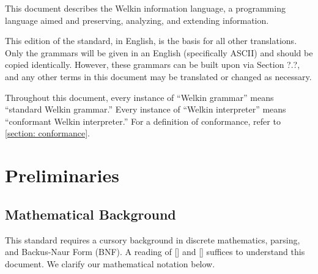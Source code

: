 

This document describes the Welkin information language, a programming language aimed and preserving, analyzing, and extending information.


This edition of the standard, in English, is the basis for all other translations. Only the grammars will be given in an English (specifically ASCII) and should be copied identically. However, these grammars can be built upon via Section ?.?, and any other terms in this document may be translated or changed as necessary.

Throughout this document, every instance of ``Welkin grammar'' means ``standard Welkin grammar.'' Every instance of ``Welkin interpreter'' means ``conformant Welkin interpreter.'' For a definition of conformance, refer to \ref{section: conformance}.

\section{Preliminaries}

\newcommand*{\chars}{\mathrm{CHAR}}
\newcommand*{\numbers}{\mathrm{NUMBERS}}
\newcommand*{\whitespaces}{\mathrm{WHITE\_SPACES}}
\newcommand*{\reserved}{\mathrm{RESERVED}}
\newcommand*{\strings}{\mathrm{STRING}}
\newcommand*{\term}{\mathrm{term}}
\newcommand*{\terms}{\mathrm{terms}}
\newcommand*{\delimiters}{\mathrm{DELIMITERS}}
\newcommand*{\escapes}{\mathrm{STRING\_ESCAPES}}
\newcommand*{\encoding}{\mathcal{E}}
\newcommand*{\decoding}{\mathcal{D}}
\newcommand*{\can}{\textrm{Can}}


\newcommand*{\scope}{\textrm{scope}}

\subsection{Mathematical Background}
This standard requires a cursory background in discrete mathematics, parsing, and Backus-Naur Form (BNF). A reading of [] and [] suffices to understand this document. We clarify our mathematical notation below.

